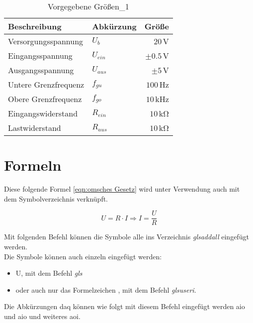 \begin{table}[htp]
\centering
\caption[Vorgegebene Größen\_1]{Vorgegebene Größen\_1}
\label{tab: Vorgegebene Größen_1}
\footnotesize
\begin{tabular}{l l r}
    \toprule
    Beschreibung & Abkürzung & Größe \\
    \midrule
    Versorgungsspannung & $U_b$ & $20$\,\si{\volt}\\
    Eingangsspannung & $U_{ein}$ & $\pm0.5$\,\si{\volt}\\
    Ausgangsspannung & $U_{aus}$ & $\pm5$\,\si{\volt}\\
    Untere Grenzfrequenz & $f_{gu}$ & $100$\,\si{\hertz}\\
    Obere Grenzfrequenz & $f_{go}$ & $10$\,\si{\kilo\hertz}\\
    Eingangswiderstand & $R_{ein}$ & $10$\,\si{\kilo\ohm}\\
    Lastwiderstand & $R_{aus}$ & $10$\,\si{\kilo\ohm}\\
    \bottomrule
    \end{tabular}
\end{table}
                 
\section{Formeln}

Diese folgende Formel \ref{eqn:omsches Gesetz} wird unter Verwendung auch mit dem Symbolverzeichnis verknüpft. 

\begin{myequations}[!ht]
\caption[O'msches Gesetz]{}
\begin{equation}
    {U}={R}\cdot{I}
	\Rightarrow
    {I}=\frac{U}{R}
    \label{eqn:omsches Gesetz}
\end{equation} 
\end{myequations}

Mit folgenden Befehl können die Symbole alle ins Verzeichnis \glqq\textit{glsaddall}\grqq{} eingefügt werden.\\
Die Symbole können auch einzeln eingefügt werden: 
\begin{itemize}
    \item \Gls{U}, mit dem Befehl \glqq\textit{gls}\grqq{}
    \item oder auch nur das Formelzeichen , mit dem Befehl \glqq\textit{glsuseri}\grqq{}.
\end{itemize}

Die Abkürzungen \Gls{daq} können wie folgt mit diesem Befehl eingefügt werden \gls{aio} und \Gls{aio} und weiteres \gls{aoi}.


